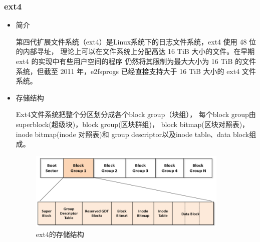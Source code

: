 \documentclass[UTF8,a4paper]{ctexart}
\begin{document}
\subsubsection{ext4}
\begin{itemize}
\item 简介

第四代扩展文件系统（ext4）是Linux系统下的日志文件系统，ext4 使用 48 位的内部寻址，
理论上可以在文件系统上分配高达 16 TiB 大小的文件。在早期 ext4 的实现中有些用户空间的程序
仍然将其限制为最大大小为 16 TiB 的文件系统，但截至 2011 年，e2fsprogs 已经直接支持大于 16 TiB 大小的 ext4 文件系统。

\item 存储结构

Ext4文件系统把整个分区划分成各个block group（块组），
每个block group由superblock(超级块)，block group(区块群组)，
 block bitmap(区块对照表)， inode bitmap(inode 对照表)和
 group descriptor以及inode table、data block组成。
	\begin{figure}[H]
		\centering
		\includegraphics[width=0.9\textwidth]{ext4.png}
		\caption{ext4的存储结构}
	\end{figure}
\end{itemize}
\end{document}
